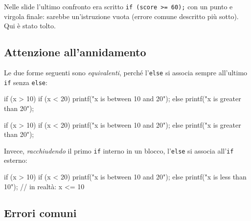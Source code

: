 \documentclass[11pt,a4paper]{article}
\begin{document}
\begin{osservazione}
Nelle slide l'ultimo confronto era scritto \lstinline|if (score >= 60);| con un punto e virgola finale: sarebbe un'istruzione vuota (errore comune descritto più sotto). Qui è stato tolto.
\end{osservazione}

\subsection{Attenzione all'annidamento}

Le due forme seguenti sono \emph{equivalenti}, perché l'\lstinline|else| si associa sempre all'ultimo \lstinline|if| senza \lstinline|else|:
\begin{codice}
if (x > 10) {
    if (x < 20)
        printf("x is between 10 and 20");
    else
        printf("x is greater than 20");
}
\end{codice}
\begin{codice}
if (x > 10)
    if (x < 20)
        printf("x is between 10 and 20");
    else
        printf("x is greater than 20");
\end{codice}
Invece, \emph{racchiudendo} il primo \lstinline|if| interno in un blocco, l'\lstinline|else| si associa all'\lstinline|if| esterno:
\begin{codice}
if (x > 10) {
    if (x < 20)
        printf("x is between 10 and 20");
}
else
    printf("x is less than 10");      // in realtà: x <= 10
\end{codice}

\subsection{Errori comuni}
\end{document}

